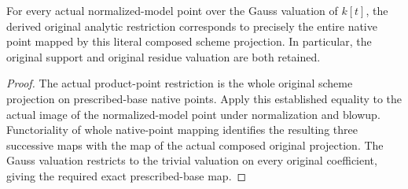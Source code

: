 \begin{theorem}
\label{local:actual-normalized-original-projection-native-point}
\leanok
{}
For every actual normalized-model point over the Gauss valuation of $k[t]$,
the derived original analytic restriction corresponds to precisely the entire
native point mapped by this literal composed scheme projection. In particular,
the original support and original residue valuation are both retained.
\end{theorem}
\begin{proof}
The actual product-point restriction is the whole original scheme projection
on prescribed-base native points. Apply this established equality to the
actual image of the normalized-model point under normalization and blowup.
Functoriality of whole native-point mapping identifies the resulting three
successive maps with the map of the actual composed original projection.
The Gauss valuation restricts to the trivial valuation on every original
coefficient, giving the required exact prescribed-base map.
\end{proof}
